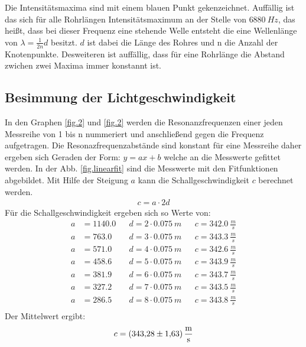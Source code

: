 Die Intensitätsmaxima sind mit einem blauen Punkt gekenzeichnet.
Auffällig ist das sich für alle Rohrlängen Intensitätsmaximum an der Stelle von $\SI{6880}{Hz}$, das heißt, dass bei dieser Frequenz eine stehende Welle entsteht die eine Wellenlänge von $\lambda=\frac{1}{2n}d$ besitzt.
$d$ ist dabei die Länge des Rohres und n die Anzahl der Knotenpunkte.
Desweiteren ist auffällig, dass für eine Rohrlänge die Abstand zwichen zwei Maxima immer konstannt ist.

\subsection{Besimmung der Lichtgeschwindigkeit}
In den Graphen \ref{fig.2} und \ref{fig.2} werden die Resonanzfrequenzen einer jeden Messreihe von 1 bis n nummeriert und anschließend gegen die Frequenz aufgetragen.
Die Resonazfrequenzabstände sind konstant für eine Messreihe daher ergeben sich Geraden der Form: $y=ax+b$ welche an die Messwerte gefittet werden.
In der Abb. \ref{fig.linearfit} sind die Messwerte mit den Fitfunktionen abgebildet.
Mit Hilfe der Steigung $a$ kann die Schallgeschwindigkeit $c$ berechnet werden.
\begin{align*}
  c = a\cdot2d
\end{align*}
Für die Schallgeschwindigkeit ergeben sich so Werte von:
\begin{align*}
a &= 1140.0 && d = 2\cdot\SI{0.075}{m} && c=\SI{342.0}{\frac{m}{s}}\\
a &= 763.0  && d = 3\cdot\SI{0.075}{m} && c=\SI{343.3}{\frac{m}{s}}\\
a &= 571.0  && d = 4\cdot\SI{0.075}{m} && c=\SI{342.6}{\frac{m}{s}}\\
a &= 458.6  && d = 5\cdot\SI{0.075}{m} && c=\SI{343.9}{\frac{m}{s}}\\
a &= 381.9  && d = 6\cdot\SI{0.075}{m} && c=\SI{343.7}{\frac{m}{s}}\\
a &= 327.2  && d = 7\cdot\SI{0.075}{m} && c=\SI{343.5}{\frac{m}{s}}\\
a &= 286.5  && d = 8\cdot\SI{0.075}{m} && c=\SI{343.8}{\frac{m}{s}}\\
\end{align*}
Der Mittelwert ergibt:
\begin{align*}
  c=\SI{343.28\pm1.63}{\frac{m}{s}}
\end{align*}
